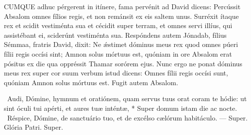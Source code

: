 
\lettrine[lines=2]{C}{UMQUE} adhuc pérgerent in itínere, fama pervénit ad David dicens: Percússit Absalom omnes fílios regis, et non remánsit ex eis saltem unus. Surréxit ítaque rex et scidit vestiménta sua et cécidit super terram, et omnes servi illíus, qui assistébant ei, sciderúnt vestiménta sua. Respóndens autem Jónadab, fílius Sémmaa, fratris David, dixit: Ne ǽstimet dóminus meus rex quod omnes púeri fílii regis occísi sint; Amnon solus mórtuus est, quóniam in ore Absalom erat pósitus ex die qua oppréssit Thamar sorórem ejus. Nunc ergo ne ponat dóminus meus rex super cor suum verbum istud dicens: Omnes fílii regis occísi sunt, quóniam Amnon solus mórtuus est. Fugit autem Absalom.

\R\ Audi, Dómine, hymnum et oratiónem, quam servus tuus orat coram te hódie: ut sint óculi tui apérti, et aures tuæ inténtæ, * Super domum istam die ac nocte. \V\ Réspice, Dómine, de sanctuário tuo, et de excélso cælórum habitáculo. --- Super. Glória Patri. Super.



